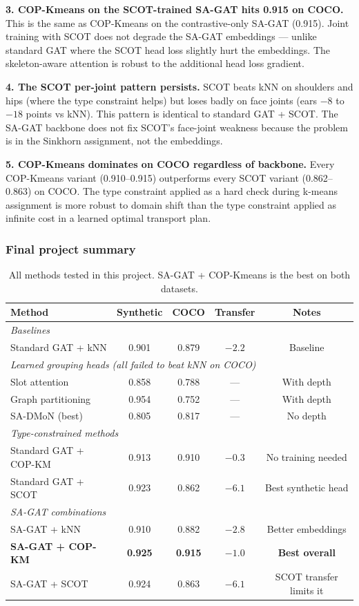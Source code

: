 \textbf{3. COP-Kmeans on the SCOT-trained SA-GAT hits 0.915 on COCO.} This is the same as COP-Kmeans on the contrastive-only SA-GAT (0.915). Joint training with SCOT does not degrade the SA-GAT embeddings --- unlike standard GAT where the SCOT head loss slightly hurt the embeddings. The skeleton-aware attention is robust to the additional head loss gradient.

\textbf{4. The SCOT per-joint pattern persists.} SCOT beats kNN on shoulders and hips (where the type constraint helps) but loses badly on face joints (ears $-8$ to $-18$ points vs kNN). This pattern is identical to standard GAT + SCOT. The SA-GAT backbone does not fix SCOT's face-joint weakness because the problem is in the Sinkhorn assignment, not the embeddings.

\textbf{5. COP-Kmeans dominates on COCO regardless of backbone.} Every COP-Kmeans variant (0.910--0.915) outperforms every SCOT variant (0.862--0.863) on COCO. The type constraint applied as a hard check during k-means assignment is more robust to domain shift than the type constraint applied as infinite cost in a learned optimal transport plan.


\subsubsection{Final project summary}

\begin{table}[H]
\centering
\footnotesize
\begin{tabular}{lcccc}
\toprule
Method & Synthetic & COCO & Transfer & Notes \\
\midrule
\multicolumn{5}{l}{\textit{Baselines}} \\
Standard GAT + kNN & 0.901 & 0.879 & $-2.2$ & Baseline \\
\midrule
\multicolumn{5}{l}{\textit{Learned grouping heads (all failed to beat kNN on COCO)}} \\
Slot attention & 0.858 & 0.788 & --- & With depth \\
Graph partitioning & 0.954 & 0.752 & --- & With depth \\
SA-DMoN (best) & 0.805 & 0.817 & --- & No depth \\
\midrule
\multicolumn{5}{l}{\textit{Type-constrained methods}} \\
Standard GAT + COP-KM & 0.913 & 0.910 & $-0.3$ & No training needed \\
Standard GAT + SCOT & 0.923 & 0.862 & $-6.1$ & Best synthetic head \\
\midrule
\multicolumn{5}{l}{\textit{SA-GAT combinations}} \\
SA-GAT + kNN & 0.910 & 0.882 & $-2.8$ & Better embeddings \\
\textbf{SA-GAT + COP-KM} & \textbf{0.925} & \textbf{0.915} & $\mathbf{-1.0}$ & \textbf{Best overall} \\
SA-GAT + SCOT & 0.924 & 0.863 & $-6.1$ & SCOT transfer limits it \\
\bottomrule
\end{tabular}
\caption{All methods tested in this project. SA-GAT + COP-Kmeans is the best on both datasets.}
\end{table}


